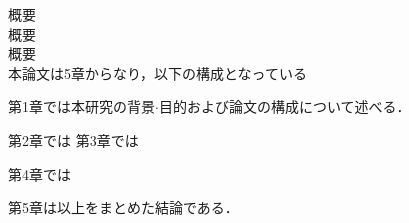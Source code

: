 
概要\\
概要\\
概要\\
本論文は5章からなり，以下の構成となっている

第1章では本研究の背景$\cdot$目的および論文の構成について述べる．

第2章では
第3章では

第4章では

第5章は以上をまとめた結論である．

